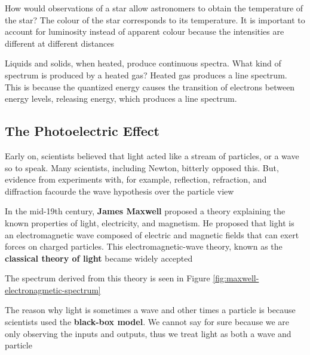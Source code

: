 \begin{sample}{How would observations of a star allow astronomers to obtain the temperature of
    the star?}
    The colour of the star corresponds to its temperature. It is important to account for luminosity
    instead of apparent colour because the intensities are different at different distances
\end{sample}

\begin{sample}{Liquids and solids, when heated, produce continuous spectra. What kind of spectrum
    is produced by a heated gas?}
    Heated gas produces a line spectrum. This is because the quantized energy causes the transition
    of electrons between energy levels, releasing energy, which produces a line spectrum.
\end{sample}

\subsection{The Photoelectric Effect}
\begin{bulleted-list}
    \item Early on, scientists believed that light acted like a stream of particles, or a wave
        so to speak. Many scientists, including Newton, bitterly opposed this. But, evidence from
        experiments with, for example, reflection, refraction, and diffraction facourde the
        wave hypothesis over the particle view
    \item In the mid-19th century, \textbf{James Maxwell} proposed a theory explaining the known
        properties of light, electricity, and magnetism. He proposed that light is an electromagnetic
        wave composed of electric and magnetic fields that can exert forces on charged particles. This
        electromagnetic-wave theory, known as the \textbf{classical theory of light} became widely
        accepted
    \item The spectrum derived from this theory is seen in Figure \ref{fig:maxwell-electronagmetic-spectrum}
    \item The reason why light is sometimes a wave and other times a particle is because scientists
        used the \textbf{black-box model}. We cannot say for sure because we are only observing
        the inputs and outputs, thus we treat light as both a wave and particle
\end{bulleted-list}

